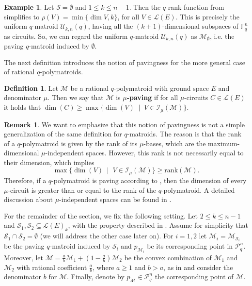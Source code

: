 \documentclass[a4paper,11pt,reqno]{amsart}
\theoremstyle{definition}
\newtheorem{definition}[theorem]{{{Definition}}}
\newtheorem{example}[theorem]{{{Example}}}
\newtheorem{remark}[theorem]{{{Remark}}}
\newcommand{\mM}{\mathcal{M}}
\newcommand{\mL}{\mathcal{L}}
\newcommand{\mU}{\mathcal{U}}
\newcommand{\mI}{\mathcal{I}}
\newcommand{\mS}{\mathcal{S}}
\newcommand{\F}{\mathbb F}
\newcommand{\RP}{\mathcal{P}_q^n}
\begin{document}
{\begin{example}
    Let $\mS=\emptyset$ and $1\leq k\leq n-1$. Then the $q$-rank function from  simplifies to $\rho(V)=\min\{\dim V,k\}$, for all $V\in\mL(E)$. This is precisely the uniform $q$-matroid $\mU_{k,n}(q)$, having all the $(k+1)$-dimensional subspaces of $\F_q^n$ as circuits. So, we can regard the uniform $q$-matroid $\mU_{k,n}(q)$ as $\mM_\emptyset$, i.e. the paving $q$-matroid induced by $\emptyset$. 
\end{example}

The next definition introduces the notion of pavingness for the more general case of rational $q$-polymatroids.

\begin{definition}\label{def: mu_paving}
    Let $\mM$ be a rational $q$-polymatroid with ground space $E$ and denominator $\mu$. Then we say that $\mM$ is \textbf{$\mu$-paving} if for all $\mu$-circuits $C\in\mL(E)$ it holds that $\dim(C)\geq \max\{\dim(V)\;\mid\; V\in\mI_\mu(\mM)\}$.
\end{definition}

\begin{remark}
    We want to emphasize that this notion of pavingness is not a simple generalization of the same definition for $q$-matroids. The reason is that the rank of a $q$-polymatroid is given by the rank of its $\mu$-bases, which are the maximum-dimensional $\mu$-independent spaces. However, this rank is not necessarily equal to their dimension, which implies
    \[
        \max\{\dim(V)\;\mid\; V\in\mI_\mu(\mM)\}\geq\text{rank}(\mM).
    \]
    Therefore, if a $q$-polymatroid is paving according to , then the dimension of every $\mu$-circuit is greater than or equal to the rank of the $q$-polymatroid. A detailed discussion about $\mu$-independent spaces can be found in \cite[Secs. 3--4]{gluesing2022independent}.       
\end{remark}


For the remainder of the section, we fix the following setting. Let $2\leq k\leq n-1$ and $\mS_1,\mS_2\subseteq \mL(E)_{k}$, with the property described in . Assume for simplicity that $\mS_1\cap\mS_2=\emptyset$ (we will address the other case later on). For $i=1,2$ let $\mM_i=\mM_{\mS_i}$ be the paving $q$-matroid induced by $\mS_i$ and $p_{\mM_i}$ be its corresponding point in $\RP$. Moreover, let $\mM = \frac{a}{b}\mM_1 +\left(1-\frac{a}{b}\right)\mM_2$ be the convex combination of $\mM_1$ and $\mM_2$ with rational coefficient $\frac{a}{b}$, where $a\geq 1$ and $b>a$, as in  and consider the denominator $b$ for $\mM$. Finally, denote by $p_\mM\in\RP$ the corresponding point of $\mM$. 

}
\end{document}
